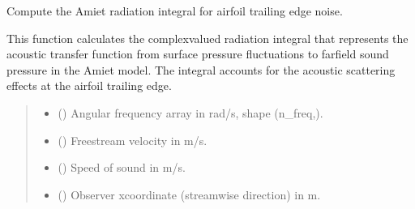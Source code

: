 \documentclass[letterpaper,10pt,english]{sphinxmanual}
\begin{document}
\begin{fulllineitems}
\label{\detokenize{radiation_integral:amiet_self_noise.radiation_integral.compute_radiation_integral}}
\pysigstartsignatures
\pysiglinewithargsret
{}
{\sphinxparamcomma {}\sphinxparamcomma {}\sphinxparamcomma {}\sphinxparamcomma {}\sphinxparamcomma {}\sphinxparamcomma {}\sphinxparamcomma {}\sphinxparamcomma {}}
{}
\pysigstopsignatures
\sphinxAtStartPar
Compute the Amiet radiation integral for airfoil trailing edge noise.

\sphinxAtStartPar
This function calculates the complex\sphinxhyphen{}valued radiation integral that
represents the acoustic transfer function from surface pressure
fluctuations to far\sphinxhyphen{}field sound pressure in the Amiet model. The
integral accounts for the acoustic scattering effects at the airfoil
trailing edge.
\begin{quote}\begin{description}
\begin{itemize}
\item {} 
\sphinxAtStartPar
{} () \textendash{} Angular frequency array in rad/s, shape (n\_freq,).

\item {} 
\sphinxAtStartPar
{} () \textendash{} Free\sphinxhyphen{}stream velocity in m/s.

\item {} 
\sphinxAtStartPar
{} () \textendash{} Speed of sound in m/s.

\item {} 
\sphinxAtStartPar
{} () \textendash{} Observer x\sphinxhyphen{}coordinate (streamwise direction) in m.


\end{itemize}
\end{description}
\end{quote}
\end{fulllineitems}
\end{document}
